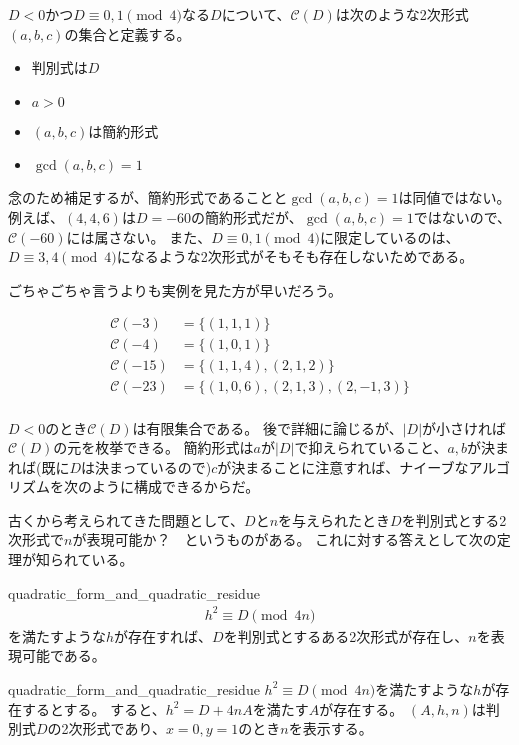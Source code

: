 $D<0$かつ$D\equiv0,1\pmod{4}$なる$D$について、$\mathcal{C}(D)$は次のような2次形式$(a,b,c)$の集合と定義する。
\begin{itemize}
 \item 判別式は$D$
 \item $a>0$
 \item $(a,b,c)$は簡約形式
 \item $\gcd(a,b,c)=1$
\end{itemize}

念のため補足するが、簡約形式であることと$\gcd(a,b,c)=1$は同値ではない。
例えば、$(4,4,6)$は$D=-60$の簡約形式だが、$\gcd(a,b,c)=1$ではないので、$\mathcal{C}(-60)$には属さない。
また、$D\equiv0,1\pmod{4}$に限定しているのは、$D\equiv3,4\pmod{4}$になるような2次形式がそもそも存在しないためである。

ごちゃごちゃ言うよりも実例を見た方が早いだろう。

\begin{align*}
\mathcal{C}(-3) &= \{(1,1,1)\}\\
\mathcal{C}(-4) &= \{(1,0,1)\}\\
\mathcal{C}(-15) &= \{(1,1,4), (2,1,2)\}\\
\mathcal{C}(-23) &= \{(1,0,6), (2,1,3), (2,-1,3)\}\\
\end{align*}

$D<0$のとき$\mathcal{C}(D)$は有限集合である。
後で詳細に論じるが、$|D|$が小さければ$\mathcal{C}(D)$の元を枚挙できる。
簡約形式は$a$が$|D|$で抑えられていること、$a,b$が決まれば(既に$D$は決まっているので)$c$が決まることに注意すれば、ナイーブなアルゴリズムを次のように構成できるからだ。


古くから考えられてきた問題として、$D$と$n$を与えられたとき$D$を判別式とする2次形式で$n$が表現可能か？　というものがある。
これに対する答えとして次の定理が知られている。

\begin{Theo}{}{quadratic_form_and_quadratic_residue}
\begin{align*}
h^2 \equiv D \pmod{4n}
\end{align*}
を満たすような$h$が存在すれば、$D$を判別式とするある2次形式が存在し、$n$を表現可能である。
\end{Theo}

\begin{thProof}{quadratic_form_and_quadratic_residue}
$h^2 \equiv D \pmod{4n}$を満たすような$h$が存在するとする。
すると、$h^2 = D + 4nA$を満たす$A$が存在する。
$(A,h,n)$は判別式$D$の2次形式であり、$x=0,y=1$のとき$n$を表示する。
\end{thProof}

